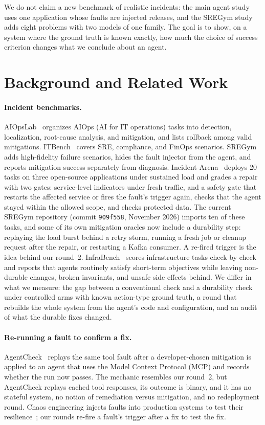 We do not claim a new benchmark of realistic incidents: the main agent study uses one application whose faults are
injected releases, and the SREGym study adds eight problems with two models of one family.
The goal is to show, on a system where the ground truth is known exactly, how much the choice of success criterion
changes what we conclude about an agent.

\section{Background and Related Work}

\paragraph{Incident benchmarks.} AIOpsLab~\citep{chen2025aiopslab} organizes AIOps (AI for IT operations) tasks into
detection, localization,
root-cause analysis, and mitigation, and lists rollback among valid mitigations. ITBench~\citep{jha2025itbench} covers
SRE, compliance, and FinOps scenarios. SREGym~\citep{clark2026sregym} adds high-fidelity failure scenarios, hides the fault
injector from the agent, and reports mitigation success separately from diagnosis. Incident-Arena~\citep{fu2026incidentarena}
deploys 20 tasks on three open-source applications under sustained load and grades a repair with two gates: service-level
indicators under fresh traffic, and a safety gate that restarts the affected service or fires the fault's trigger again,
checks that the agent stayed within the allowed scope, and checks protected data. The current SREGym repository (commit
\texttt{909f558}, November 2026) imports ten of these tasks, and some of its own mitigation oracles now include a
durability step: replaying the load burst behind a retry storm, running a fresh job or cleanup request after the repair,
or restarting a Kafka consumer. A re-fired trigger is the idea behind our round~2. InfraBench~\citep{gao2026infrabench} scores infrastructure tasks check by
check and reports that agents routinely satisfy short-term objectives while leaving non-durable changes, broken
invariants, and unsafe side effects behind. We differ in what we measure: the gap between a conventional check and a
durability check under controlled arms with known action-type ground truth, a round that rebuilds the whole system from
the agent's code and configuration, and an audit of what the durable fixes changed.

\paragraph{Re-running a fault to confirm a fix.} AgentCheck~\citep{mazumder2026agentcheck} replays the same tool fault after
a developer-chosen mitigation is applied to an agent that uses the Model Context Protocol (MCP) and records whether the
run now passes. The mechanic resembles our
round~2, but AgentCheck replays cached tool responses, its outcome is binary, and it has no stateful system, no notion of
remediation versus mitigation, and no redeployment round. Chaos engineering injects faults into production systems to
test their resilience~\citep{basiri2016chaos}; our rounds re-fire a fault's trigger after a fix to test the fix.

